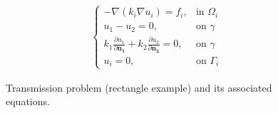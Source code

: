 \begin{figure}[htbp]
    \centering
    \begin{minipage}[t]{0.44\textwidth}
        \vspace{4pt} %
    \end{minipage}%
    \begin{minipage}[t]{0.44\textwidth}
        \vspace{-4pt} %
        \begin{align}\label{decomp_prob}
            \begin{cases}
                - \nabla \left(k_i \nabla u_i\right) = f_i, & \text{in }\Omega_i\\
                u_1 - u_2 = 0, & \text{on }\gamma\\
                k_1 \frac{\partial u_1}{\partial \mathbf{n_1}} + k_2 \frac{\partial u_2}{\partial  \mathbf{n_2}} = 0, & \text{on }\gamma\\
                u_i = 0, & \text{on }\Gamma_i
            \end{cases}
        \end{align}
    \end{minipage}
    \caption{Transmission problem (rectangle example) and its associated equations.}
    \label{transmission_problem_figure}
\end{figure}

